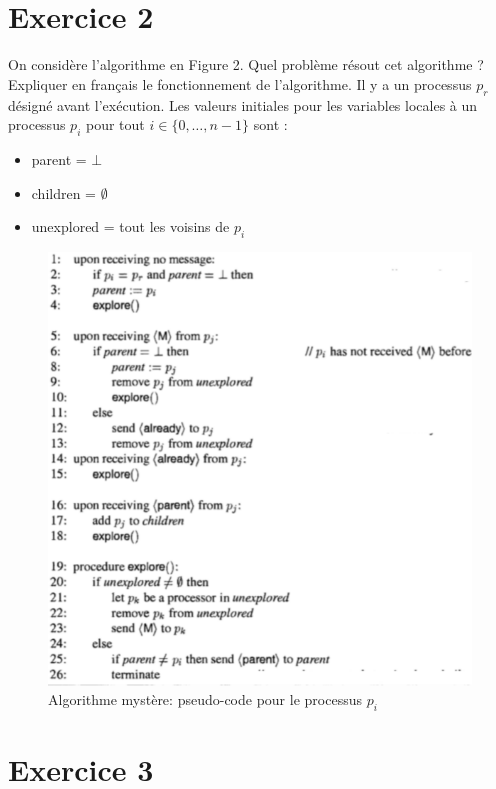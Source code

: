 \documentclass[10pt,a4paper]{article}
\begin{document}
\newpage

\section*{Exercice 2}

On considère l'algorithme en Figure 2. Quel problème résout cet algorithme ? Expliquer en français le fonctionnement de l'algorithme. Il y a un processus $p_r$ désigné avant l'exécution. Les valeurs initiales pour les variables locales à un processus $p_i$ pour tout $i \in \{0, \ldots, n-1 \}$ sont :
\begin{itemize}
    \item parent = $\bot$
    \item children = $\emptyset$
    \item unexplored = tout les voisins de $p_i$
\end{itemize}


\begin{figure}[h!]
    \centering
    \includegraphics[scale=0.6]{fig2.png}
    \caption{Algorithme mystère: pseudo-code pour le processus $p_i$}
    \label{fig:my_label}
\end{figure}

\section*{Exercice 3}
\end{document}
